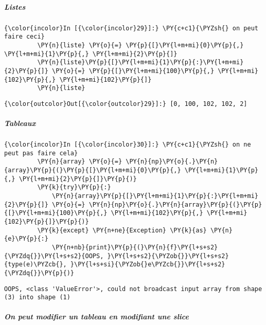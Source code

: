     \hypertarget{listes}{%
\subparagraph{Listes}\label{listes}}

    \begin{Verbatim}[commandchars=\\\{\}]
{\color{incolor}In [{\color{incolor}29}]:} \PY{c+c1}{\PYZsh{} on peut faire ceci}
         \PY{n}{liste} \PY{o}{=} \PY{p}{[}\PY{l+m+mi}{0}\PY{p}{,} \PY{l+m+mi}{1}\PY{p}{,} \PY{l+m+mi}{2}\PY{p}{]}
         \PY{n}{liste}\PY{p}{[}\PY{l+m+mi}{1}\PY{p}{:}\PY{l+m+mi}{2}\PY{p}{]} \PY{o}{=} \PY{p}{[}\PY{l+m+mi}{100}\PY{p}{,} \PY{l+m+mi}{102}\PY{p}{,} \PY{l+m+mi}{102}\PY{p}{]}
         \PY{n}{liste}
\end{Verbatim}


\begin{Verbatim}[commandchars=\\\{\}]
{\color{outcolor}Out[{\color{outcolor}29}]:} [0, 100, 102, 102, 2]
\end{Verbatim}
            
    \hypertarget{tableaux}{%
\subparagraph{Tableaux}\label{tableaux}}

    \begin{Verbatim}[commandchars=\\\{\}]
{\color{incolor}In [{\color{incolor}30}]:} \PY{c+c1}{\PYZsh{} on ne peut pas faire cela}
         \PY{n}{array} \PY{o}{=} \PY{n}{np}\PY{o}{.}\PY{n}{array}\PY{p}{(}\PY{p}{[}\PY{l+m+mi}{0}\PY{p}{,} \PY{l+m+mi}{1}\PY{p}{,} \PY{l+m+mi}{2}\PY{p}{]}\PY{p}{)}
         \PY{k}{try}\PY{p}{:}
             \PY{n}{array}\PY{p}{[}\PY{l+m+mi}{1}\PY{p}{:}\PY{l+m+mi}{2}\PY{p}{]} \PY{o}{=} \PY{n}{np}\PY{o}{.}\PY{n}{array}\PY{p}{(}\PY{p}{[}\PY{l+m+mi}{100}\PY{p}{,} \PY{l+m+mi}{102}\PY{p}{,} \PY{l+m+mi}{102}\PY{p}{]}\PY{p}{)}
         \PY{k}{except} \PY{n+ne}{Exception} \PY{k}{as} \PY{n}{e}\PY{p}{:}
             \PY{n+nb}{print}\PY{p}{(}\PY{n}{f}\PY{l+s+s2}{\PYZdq{}}\PY{l+s+s2}{OOPS, }\PY{l+s+s2}{\PYZob{}}\PY{l+s+s2}{type(e)\PYZcb{}, }\PY{l+s+si}{\PYZob{}e\PYZcb{}}\PY{l+s+s2}{\PYZdq{}}\PY{p}{)}
\end{Verbatim}


    \begin{Verbatim}[commandchars=\\\{\}]
OOPS, <class 'ValueError'>, could not broadcast input array from shape (3) into shape (1)

    \end{Verbatim}

    \hypertarget{on-peut-modifier-un-tableau-en-modifiant-une-slice}{%
\subparagraph{On peut modifier un tableau en modifiant une
slice}\label{on-peut-modifier-un-tableau-en-modifiant-une-slice}}

